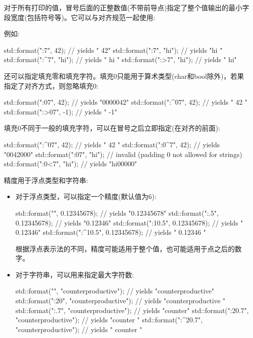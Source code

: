 
对于所有打印的值，冒号后面的正整数值(不带前导点)指定了整个值输出的最小字段宽度(包括符号等)。它可以与对齐规范一起使用:

例如:

\begin{cpp}
std::format("{:7}", 42);     // yields "           42"
std::format("{:7}", "hi");   // yields "hi           "
std::format("{:^7}", "hi");  // yields "      hi     "
std::format("{:>7}", "hi");  // yields "           hi"
\end{cpp}

还可以指定填充零和填充字符。填充0只能用于算术类型(char和bool除外)，若果指定了对齐方式，则忽略填充0:

\begin{cpp}
std::format("{:07}", 42);    // yields "0000042"
std::format("{:^07}", 42);   // yields "  42   "
std::format("{:>07}", -1);   // yields "     -1"
\end{cpp}

填充0不同于一般的填充字符，可以在冒号之后立即指定(在对齐的前面):

\begin{cpp}
std::format("{:^07}", 42);   // yields "  42   "
std::format("{:0^7}", 42);   // yields "0042000"
std::format("{:07}", "hi");  // invalid (padding 0 not allowed for strings)
std::format("{:0<7}", "hi"); // yields "hi00000"
\end{cpp}

精度用于浮点类型和字符串:

\begin{itemize}
\item
对于浮点类型，可以指定一个精度(默认值为6):

\begin{cpp}
std::format("{}", 0.12345678);         // yields "0.12345678"
std::format("{:.5}", 0.12345678);      // yields "0.12346"
std::format("{:10.5}", 0.12345678);    // yields "   0.12346"
std::format("{:^10.5}", 0.12345678);   // yields " 0.12346  "
\end{cpp}

根据浮点表示法的不同，精度可能适用于整个值，也可能适用于点之后的数字。

\item
对于字符串，可以用来指定最大字符数:

\begin{cpp}
std::format("{}", "counterproductive");            // yields "counterproductive"
std::format("{:20}", "counterproductive");         // yields "counterproductive    "
std::format("{:.7}", "counterproductive");         // yields "counter"
std::format("{:20.7}", "counterproductive");       // yields "counter              "
std::format("{:^20.7}", "counterproductive");      // yields "        counter      "
\end{cpp}
\end{itemize}

